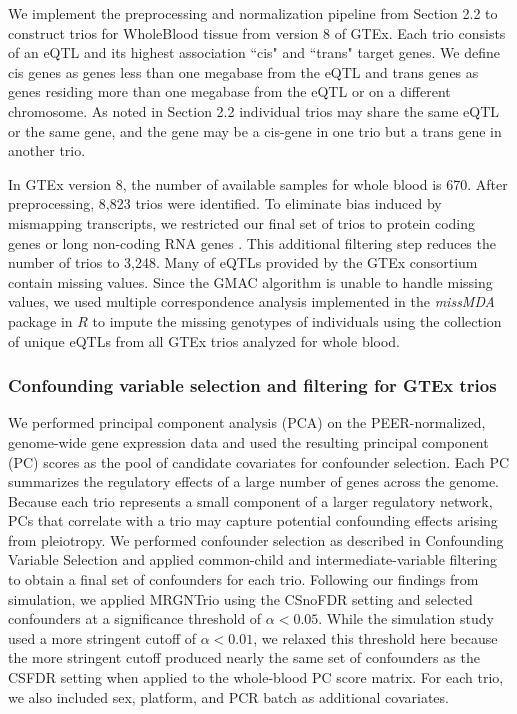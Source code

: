 \documentclass[12pt,letterpaper]{report}
\begin{document}
\begin{doublespace}
We implement the preprocessing and normalization pipeline from Section 2.2 to construct trios for WholeBlood tissue from version 8 of GTEx. Each trio consists of an eQTL and its highest association ``cis" and ``trans" target genes.  We define cis genes as genes less than one megabase from the eQTL and trans genes as genes residing more than one megabase from the eQTL or on a different chromosome. As noted in Section 2.2 individual trios may share the same eQTL or the same gene, and the gene may be a cis-gene in one trio but a trans gene in another trio. 

In GTEx version 8, the number of available samples for whole blood is 670. After preprocessing, 8,823 trios were identified. To eliminate bias induced by mismapping transcripts, we restricted our final set of trios to protein coding genes or long non-coding RNA genes \cite{yang2017identifying}. This additional filtering step reduces the number of trios to 3,248.  Many of eQTLs provided by the GTEx consortium contain missing values. Since the GMAC algorithm is unable to handle missing values, we used multiple correspondence analysis implemented in the \textit{missMDA} package in $R$ \cite{josse2016missmda} to impute the missing genotypes of individuals using the collection of unique eQTLs from all GTEx trios analyzed for whole blood. 

\subsubsection{Confounding variable selection and filtering for GTEx trios}

We performed principal component analysis (PCA) on the PEER-normalized, genome-wide gene expression data and used the resulting principal component (PC) scores as the pool of candidate covariates for confounder selection. Each PC summarizes the regulatory effects of a large number of genes across the genome. Because each trio represents a small component of a larger regulatory network, PCs that correlate with a trio may capture potential confounding effects arising from pleiotropy. We performed confounder selection as described in Confounding Variable Selection and applied common-child and intermediate-variable filtering to obtain a final set of confounders for each trio. Following our findings from simulation, we applied MRGNTrio using the CSnoFDR setting and selected confounders at a significance threshold of $\alpha < 0.05$. While the simulation study used a more stringent cutoff of $\alpha < 0.01$, we relaxed this threshold here because the more stringent cutoff produced nearly the same set of confounders as the CSFDR setting when applied to the whole-blood PC score matrix. For each trio, we also included sex, platform, and PCR batch as additional covariates.


\end{doublespace}
\end{document}
